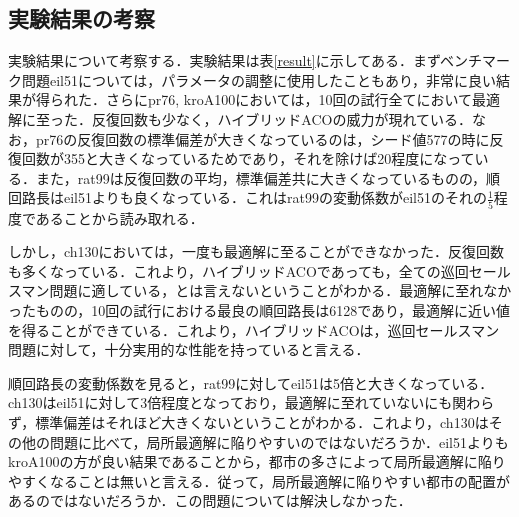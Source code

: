 \documentclass[a4j]{jsarticle}
\begin{document}
\subsection{実験結果の考察}
実験結果について考察する．実験結果は表\ref{result}に示してある．まずベンチマーク問題eil51については，パラメータの調整に使用したこともあり，非常に良い結果が得られた．さらにpr76, kroA100においては，10回の試行全てにおいて最適解に至った．反復回数も少なく，ハイブリッドACOの威力が現れている．なお，pr76の反復回数の標準偏差が大きくなっているのは，シード値577の時に反復回数が355と大きくなっているためであり，それを除けば20程度になっている．また，rat99は反復回数の平均，標準偏差共に大きくなっているものの，順回路長はeil51よりも良くなっている．これはrat99の変動係数がeil51のそれの$\frac{1}{5}$程度であることから読み取れる．
\par
しかし，ch130においては，一度も最適解に至ることができなかった．反復回数も多くなっている．これより，ハイブリッドACOであっても，全ての巡回セールスマン問題に適している，とは言えないということがわかる．最適解に至れなかったものの，10回の試行における最良の順回路長は6128であり，最適解に近い値を得ることができている．これより，ハイブリッドACOは，巡回セールスマン問題に対して，十分実用的な性能を持っていると言える．
\par
順回路長の変動係数を見ると，rat99に対してeil51は5倍と大きくなっている．ch130はeil51に対して3倍程度となっており，最適解に至れていないにも関わらず，標準偏差はそれほど大きくないということがわかる．これより，ch130はその他の問題に比べて，局所最適解に陥りやすいのではないだろうか．eil51よりもkroA100の方が良い結果であることから，都市の多さによって局所最適解に陥りやすくなることは無いと言える．従って，局所最適解に陥りやすい都市の配置があるのではないだろうか．この問題については解決しなかった．
\end{document}
